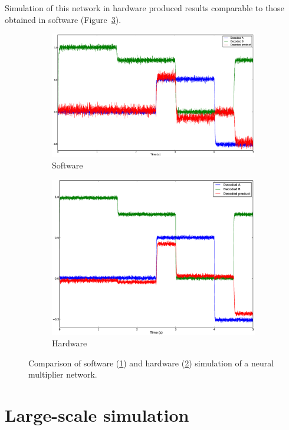 \documentclass[english]{article}
\begin{document}
Simulation of this network in hardware produced results comparable to those obtained in software
(Figure~\ref{fig:multiplier}).

\begin{figure}
\centering


\begin{subfigure}[b]{0.4\textwidth}
\centering
\includegraphics[width=4in]{multiplier-sw.eps}
\caption{Software}
\label{fig:multiplier:sw}
\end{subfigure}

\begin{subfigure}[b]{0.4\textwidth}
\centering
\includegraphics[width=4in]{multiplier.eps}
\caption{Hardware}
\label{fig:multiplier:hw}
\end{subfigure}

\caption[Multiplier simulation comparison.]
{Comparison of software (\ref{fig:multiplier:sw}) and hardware (\ref{fig:multiplier:hw})
simulation of a neural multiplier network.}
\label{fig:multiplier}
\end{figure}

\section{Large-scale simulation}
\end{document}
